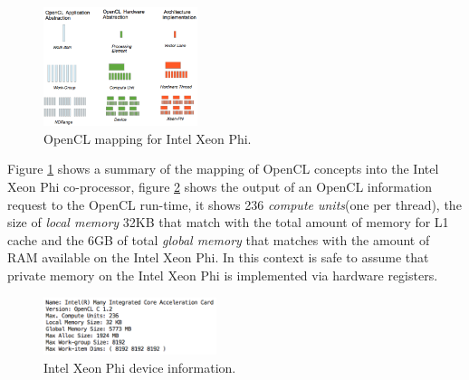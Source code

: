 \begin{figure}[!h]
    \centering
    \includegraphics[width=0.4\textwidth]{figures/phi_model.png}
    \caption{OpenCL mapping for Intel Xeon Phi.}
    \label{PhiModel}
\end{figure}

\par{Figure \ref{PhiModel} shows a summary of the mapping of OpenCL concepts into the Intel Xeon Phi co-processor, figure 
    \ref{PhiDeviceInfo} shows the output of an OpenCL information request to the OpenCL run-time, it shows 236 
    \emph{compute units}(one per thread), the size of \emph{local memory} 32KB that match with the total amount of memory for L1 cache and
    the 6GB of total \emph{global memory} that matches with the amount of RAM available on the Intel Xeon Phi. In this context is 
    safe to assume that private memory on the Intel Xeon Phi is implemented via hardware registers.} 

\begin{figure}[!h]
    \centering
    \includegraphics[width=0.45\textwidth]{figures/phi_device_info.png}
    \caption{Intel Xeon Phi device information.}
    \label{PhiDeviceInfo}
\end{figure}



